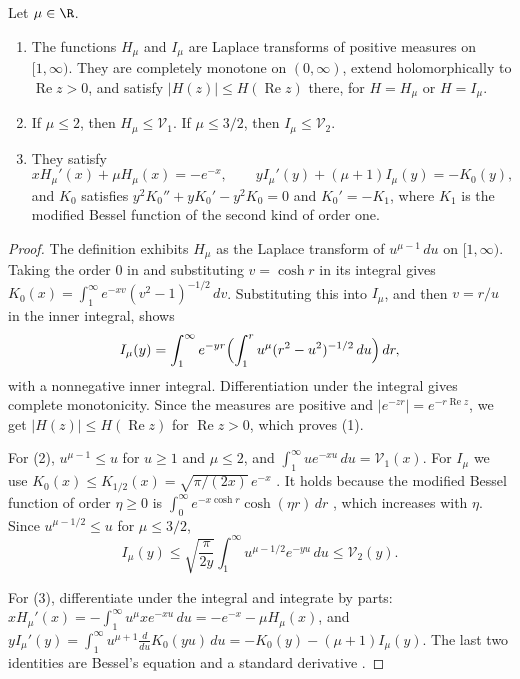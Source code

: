 \begin{lemma}\label{an:kernels}
Let $\mu\in\R$.
\begin{enumerate}
\item The functions $H_\mu$ and $I_\mu$ are Laplace transforms of positive
 measures on $[1,\infty)$. They are completely monotone on $(0,\infty)$,
 extend holomorphically to $\operatorname{Re}z>0$, and satisfy
 $|H(z)|\le H(\operatorname{Re}z)$ there, for $H=H_\mu$ or $H=I_\mu$.
\item If $\mu\le2$, then $H_\mu\le\mathcal V_1$. If $\mu\le3/2$, then
 $I_\mu\le\mathcal V_2$.
\item They satisfy
 \[
 xH_\mu'(x)+\mu H_\mu(x)=-e^{-x},\qquad
 yI_\mu'(y)+(\mu+1)I_\mu(y)=-K_0(y),
 \]
 and $K_0$ satisfies $y^2K_0''+yK_0'-y^2K_0=0$ and $K_0'=-K_1$, where
 $K_1$ is the modified Bessel function of the second kind of order one.
\end{enumerate}
\end{lemma}

\begin{proof}
The definition exhibits $H_\mu$ as the Laplace transform of
$u^{\mu-1}\,du$ on $[1,\infty)$. Taking the order $0$ in
\cite[10.32.9]{DLMF} and substituting $v=\cosh r$ in its integral gives
$K_0(x)=\int_1^\infty e^{-xv}(v^2-1)^{-1/2}\,dv$. Substituting this into
$I_\mu$, and then $v=r/u$ in the inner integral, shows
\[
 I_\mu(y)=\int_1^\infty e^{-yr}\Bigl(\int_1^ru^\mu(r^2-u^2)^{-1/2}\,du\Bigr)
 \,dr,
\]
with a nonnegative inner integral. Differentiation under the integral
gives complete monotonicity. Since the measures are positive and
$|e^{-zr}|=e^{-r\operatorname{Re}z}$, we get $|H(z)|\le H(\operatorname{Re}z)$
for $\operatorname{Re}z>0$, which proves (1).

For (2), $u^{\mu-1}\le u$ for $u\ge1$ and $\mu\le2$, and
$\int_1^\infty ue^{-xu}\,du=\mathcal V_1(x)$. For $I_\mu$ we use
$K_0(x)\le K_{1/2}(x)=\sqrt{\pi/(2x)}\,e^{-x}$ \cite[10.39.2]{DLMF}. It
holds because the modified Bessel function of order $\eta\ge0$ is
$\int_0^\infty e^{-x\cosh r}\cosh(\eta r)\,dr$ \cite[10.32.9]{DLMF}, which
increases with $\eta$. Since $u^{\mu-1/2}\le u$ for $\mu\le3/2$,
\[
 I_\mu(y)\le\sqrt{\frac\pi{2y}}\int_1^\infty u^{\mu-1/2}e^{-yu}\,du
 \le\mathcal V_2(y).
\]

For (3), differentiate under the integral and integrate by parts:
$xH_\mu'(x)=-\int_1^\infty u^\mu xe^{-xu}\,du=-e^{-x}-\mu H_\mu(x)$, and
$yI_\mu'(y)=\int_1^\infty u^{\mu+1}\frac{d}{du}K_0(yu)\,du
=-K_0(y)-(\mu+1)I_\mu(y)$. The last two identities are Bessel's equation
and a standard derivative \cite[10.25.1, 10.29.3]{DLMF}.
\end{proof}

